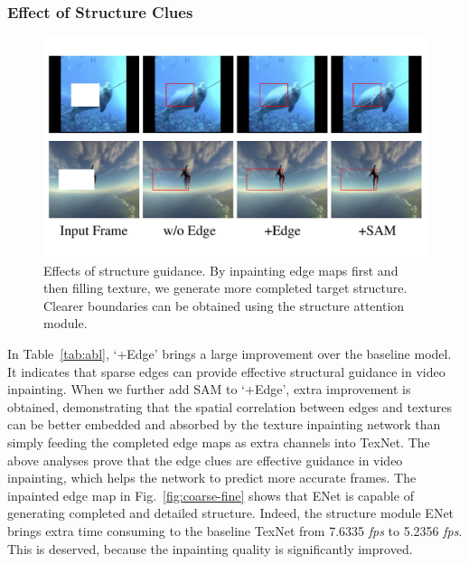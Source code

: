 \subsubsection{Effect of Structure Clues}


\begin{figure}[t]
	\centering
	\includegraphics[width=0.97\columnwidth]{edgevis} %
	\caption{Effects of structure guidance. By inpainting edge maps first and then filling texture, we generate more completed target structure. Clearer boundaries can be obtained using the structure attention module.}
	\label{edgevis}
\end{figure}



In Table~\ref{tab:abl}, `+Edge' brings a large improvement over the baseline model.
It indicates that sparse edges can provide effective structural guidance in video inpainting.%
When we further add SAM to `+Edge', extra improvement is obtained, demonstrating that the spatial correlation between edges and textures can be better embedded and absorbed by the texture inpainting network than simply feeding the completed edge maps as extra channels into TexNet.
The above analyses prove that the edge clues are effective guidance in video inpainting, which helps the network to predict more accurate frames.
The inpainted edge map in Fig.~\ref{fig:coarse-fine} shows that ENet is capable of generating completed and detailed structure.
Indeed, the structure module ENet brings extra time consuming to the baseline TexNet from 7.6335 \emph{fps} to 5.2356 \emph{fps}.
This is deserved, because the inpainting quality is significantly improved.

